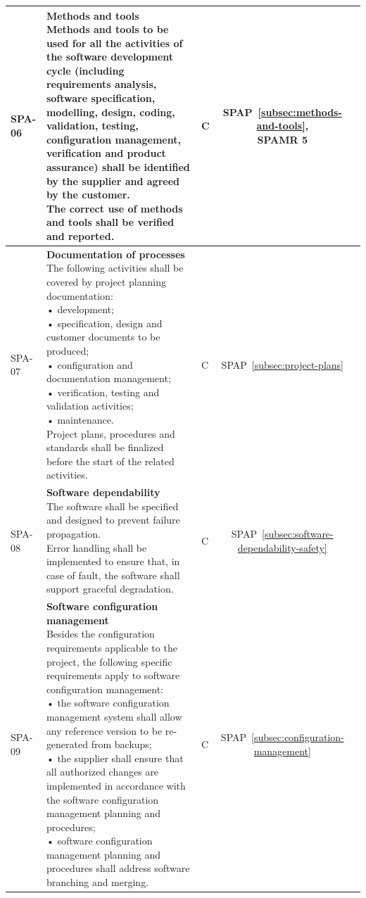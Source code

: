{\begin{xltabular}{\textwidth}{|l|L|l|S|S|}
        SPA-06 &
        {\textbf{Methods and tools} \newline
        Methods and tools to be used for all the activities of the software development cycle (including requirements analysis, software specification, modelling, design, coding, validation, testing, configuration management, verification and product assurance) shall be identified by the supplier and agreed by the customer. \newline
        The correct use of methods and tools shall be verified and reported.} &
        C &
        {SPAP~\ref{subsec:methods-and-tools}, \newline SPAMR 5} &
        \\ \hline

        SPA-07 &
        {\textbf{Documentation of processes} \newline
        The following activities shall be covered by project planning documentation: \newline
        • development; \newline
        • specification, design and customer documents to be produced; \newline
        • configuration and documentation management; \newline
        • verification, testing and validation activities; \newline
        • maintenance. \newline
        Project plans, procedures and standards shall be finalized before the start of the related activities.} &
        C &
        {SPAP~\ref{subsec:project-plans}} &
        \\ \hline

        SPA-08 &
        {\textbf{Software dependability} \newline
        The software shall be specified and designed to prevent failure propagation. \newline
        Error handling shall be implemented to ensure that, in case of fault, the software shall support graceful degradation.} &
        C &
        {SPAP~\ref{subsec:software-dependability-safety}} &
        \\ \hline

        SPA-09 &
        {\textbf{Software configuration management} \newline
        Besides the configuration requirements applicable to the project, the following specific requirements apply to software configuration management: \newline
        • the software configuration management system shall allow any reference version to be re-generated from backups; \newline
        • the supplier shall ensure that all authorized changes are implemented in accordance with the software configuration management planning and procedures; \newline
        • software configuration management planning and procedures shall address software branching and merging.} &
        C &
        {SPAP~\ref{subsec:configuration-management}} &
        \\ \hline


\end{xltabular}}

